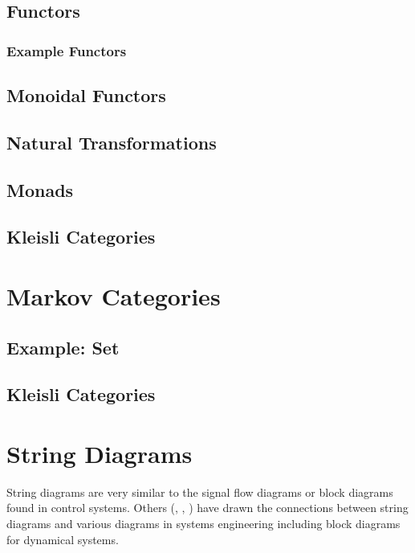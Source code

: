 
\subsection{Functors}
\subsubsection{Example Functors}
\subsection{Monoidal Functors}
\subsection{Natural Transformations}
\subsection{Monads}
\subsection{Kleisli Categories}

\section{Markov Categories}

\newcommand{\id}{\mathrm{id}}
\newcommand{\comul}{\Delta}
\newcommand{\counit}{\delta}

\subsection{Example: Set}
\subsection{Kleisli Categories}

\section{String Diagrams}

String diagrams are very similar to the signal flow diagrams or block diagrams found in control systems.
Others (\cite{baez2015control}, \cite{fong2016thesis}, \cite{fong2016dynamicalsystems}) have drawn the connections between string diagrams and various diagrams in systems engineering including block diagrams for dynamical systems.

